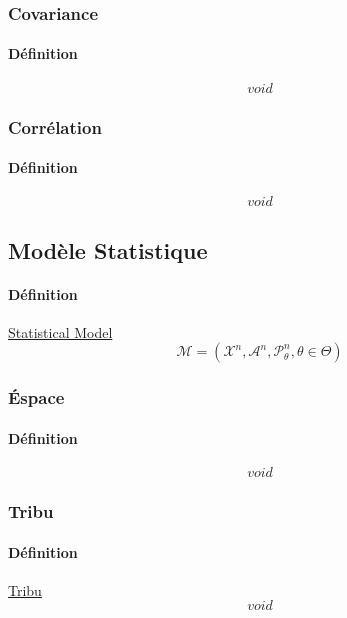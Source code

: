 \documentclass{article}
\begin{document}
\subsubsection{Covariance}
\paragraph{Définition}
\begin{equation}
    \boxed{
        void
    }
\end{equation}

\subsubsection{Corrélation}
\paragraph{Définition}
\begin{equation}
    \boxed{
        void
    }
\end{equation}


\subsection{Modèle Statistique}
\paragraph{Définition} \href{https://en.wikipedia.org/wiki/Statistical_model}{Statistical Model}
\begin{equation}
    \boxed{
        \mathcal{M} = (\mathcal{X}^{n}, \mathcal{A}^{n}, \mathcal{P}^{n}_{\theta}, \theta\in\Theta)
    }
\end{equation}

\subsubsection{Éspace}
\paragraph{Définition}
\begin{equation}
    \boxed{
        void
    }
\end{equation}

\subsubsection{Tribu}
\paragraph{Définition} \href{https://fr.wikipedia.org/wiki/Tribu_(math%C3%A9matiques)}{Tribu}
\begin{equation}
    \boxed{
        void
    }
\end{equation}
\end{document}

